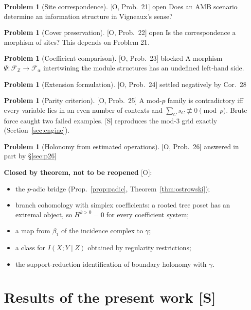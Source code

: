 \documentclass[11pt]{article}
\theoremstyle{definition}
\newtheorem{problem}[theorem]{Problem}
\theoremstyle{remark}
\newcommand{\Z}{\mathbb{Z}}
\newcommand{\src}[1]{\textsf{\small[#1]}}
\newcommand{\st}[1]{\textsf{\small\color{gray}#1}}
\begin{document}
\begin{problem}[Site correspondence]\src{O, Prob.~21} \st{open} Does an AMB scenario determine an information structure in Vigneaux's sense?\end{problem}
\begin{problem}[Cover preservation]\src{O, Prob.~22} \st{open} Is the correspondence a morphism of sites? This depends on Problem 21.\end{problem}
\begin{problem}[Coefficient comparison]\src{O, Prob.~23} \st{blocked} A morphism $\Psi:\mathcal F_\Z\to\mathcal F_\alpha$ intertwining the module structures has an undefined left-hand side.\end{problem}
\begin{problem}[Extension formulation]\src{O, Prob.~24} \st{settled negatively by Cor.~28}\end{problem}
\begin{problem}[Parity criterion]\label{prob:parity}\src{O, Prob.~25}
A mod-$p$ family is contradictory iff every variable lies in an even number of contexts and $\sum_Cs_C\not\equiv0\pmod p$. Brute force caught two failed examples. \src{S} reproduces the mod-3 grid exactly (Section~\ref{sec:engine}).
\end{problem}
\begin{problem}[Holonomy from estimated operations]\src{O, Prob.~26} \st{answered in part by \S\ref{sec:p26}}\end{problem}

\noindent\textbf{Closed by theorem, not to be reopened} \src{O}:
\begin{itemize}
  \item the $p$-adic bridge (Prop.~\ref{prop:padic}, Theorem~\ref{thm:ostrowski});
  \item branch cohomology with simplex coefficients: a rooted tree poset has an extremal object, so $H^{k>0}=0$ for every coefficient system;
  \item a map from $\beta_1$ of the incidence complex to $\gamma$;
  \item a class for $I(X;Y\mid Z)$ obtained by regularity restrictions;
  \item the support-reduction identification of boundary holonomy with $\gamma$.
\end{itemize}

\part{Results of the present work \src{S}}
\end{document}
